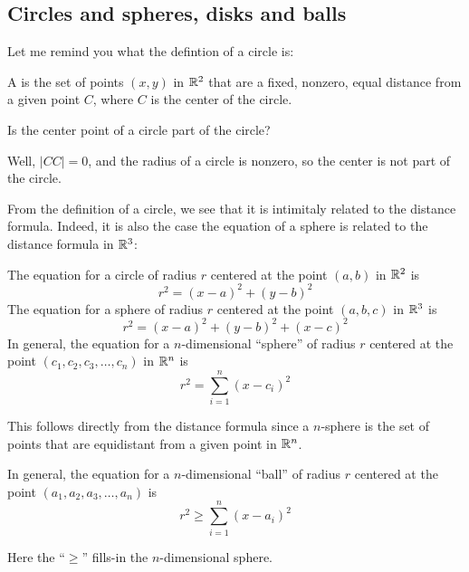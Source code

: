 \documentclass{ximera}
\begin{document}
\subsection{Circles and spheres, disks and balls}

Let me remind you what the defintion of a circle is:
\begin{definition}
  A  is the set of points $(x,y)$ in $\mathbb R^2$ that are a
  fixed, nonzero, equal distance from a given point $C$, where $C$ is
  the center of the circle.
\end{definition}

\begin{question}
  Is the center point of a circle part of the circle?
  \begin{prompt}
    \begin{multipleChoice}
    \end{multipleChoice}
    \begin{feedback}
      Well, $|CC|=0$, and the radius of a circle is nonzero, so the
      center is not part of the circle.
    \end{feedback}
  \end{prompt}
\end{question}

From the definition of a circle, we see that it is intimitaly related
to the distance formula. Indeed, it is also the case the equation of a
sphere is related to the distance formula in $\mathbb R^3$:

\begin{theorem}
  The equation for a circle of radius $r$ centered at the point
  $(a,b)$ in $\mathbb R^2$ is
  \[
  r^2=(x-a)^2 + (y-b)^2
  \]
  The equation for a sphere of radius $r$ centered at the point
  $(a,b,c)$ in $\mathbb R^3$ is
  \[
  r^2 = (x-a)^2 + (y-b)^2 + (x-c)^2
  \]
  In general, the equation for a $n$-dimensional ``sphere'' of radius
  $r$ centered at the point $(c_1,c_2,c_3,\dots,c_n)$ in $\mathbb R^n$ is
  \[
  r^2 = \sum_{i=1}^n(x-c_i)^2
  \]
  \begin{explanation}
    This follows directly from the distance formula since a $n$-sphere
    is the set of points that are equidistant from a given point in
    $\mathbb R^n$.
  \end{explanation}
\end{theorem}

\begin{corollary}
  In general, the equation for a $n$-dimensional ``ball'' of radius
  $r$ centered at the point $(a_1,a_2,a_3,\dots,a_n)$ is
  \[
  r^2 \ge \sum_{i=1}^n(x-a_i)^2
  \]
  \begin{explanation}
    Here the ``$\ge$'' fills-in the $n$-dimensional sphere.
  \end{explanation}
\end{corollary}
\end{document}
